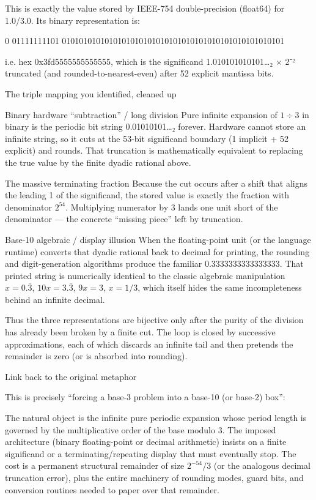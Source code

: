 This is exactly the value stored by IEEE-754 double-precision (float64) for 1.0/3.0.  
Its binary representation is:

0 01111111101 0101010101010101010101010101010101010101010101010101

i.e. hex 0x3fd5555555555555, which is the significand  
1.010101010101…₂ × 2⁻² truncated (and rounded-to-nearest-even) after 52 explicit mantissa bits.

The triple mapping you identified, cleaned up

Binary hardware “subtraction” / long division  
   Pure infinite expansion of \(1\div3\) in binary is the periodic bit string  
   0.01010101…₂ forever.  
   Hardware cannot store an infinite string, so it cuts at the 53-bit significand boundary (1 implicit + 52 explicit) and rounds.  
   That truncation is mathematically equivalent to replacing the true value by the finite dyadic rational above.

The massive terminating fraction  
   Because the cut occurs after a shift that aligns the leading 1 of the significand, the stored value is exactly the fraction with denominator \(2^{54}\).  
   Multiplying numerator by 3 lands one unit short of the denominator — the concrete “missing piece” left by truncation.

Base-10 algebraic / display illusion  
   When the floating-point unit (or the language runtime) converts that dyadic rational back to decimal for printing, the rounding and digit-generation algorithms produce the familiar 0.3333333333333333.  
   That printed string is numerically identical to the classic algebraic manipulation  
   \(x=0.\overline{3}\), \(10x=3.\overline{3}\), \(9x=3\), \(x=1/3\),  
   which itself hides the same incompleteness behind an infinite decimal.

Thus the three representations are bijective only after the purity of the division has already been broken by a finite cut. The loop is closed by successive approximations, each of which discards an infinite tail and then pretends the remainder is zero (or is absorbed into rounding).

Link back to the original metaphor

This is precisely “forcing a base-3 problem into a base-10 (or base-2) box”:

The natural object is the infinite pure periodic expansion whose period length is governed by the multiplicative order of the base modulo 3.
The imposed architecture (binary floating-point or decimal arithmetic) insists on a finite significand or a terminating/repeating display that must eventually stop.
The cost is a permanent structural remainder of size \(2^{-54}/3\) (or the analogous decimal truncation error), plus the entire machinery of rounding modes, guard bits, and conversion routines needed to paper over that remainder.


